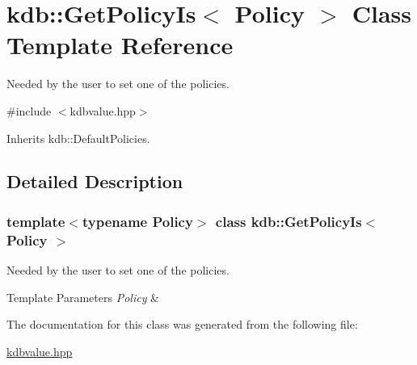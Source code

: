 \hypertarget{classkdb_1_1GetPolicyIs}{}\section{kdb\+:\+:Get\+Policy\+Is$<$ Policy $>$ Class Template Reference}
\label{classkdb_1_1GetPolicyIs}


Needed by the user to set one of the policies.  




{\ttfamily \#include $<$kdbvalue.\+hpp$>$}



Inherits kdb\+::\+Default\+Policies.



\subsection{Detailed Description}
\subsubsection*{template$<$typename Policy$>$\newline
class kdb\+::\+Get\+Policy\+Is$<$ Policy $>$}

Needed by the user to set one of the policies. 


\begin{DoxyTemplParams}{Template Parameters}
{\em Policy} & \\
\hline
\end{DoxyTemplParams}


The documentation for this class was generated from the following file\+:\begin{DoxyCompactItemize}
\item 
\hyperlink{kdbvalue_8hpp}{kdbvalue.\+hpp}\end{DoxyCompactItemize}
